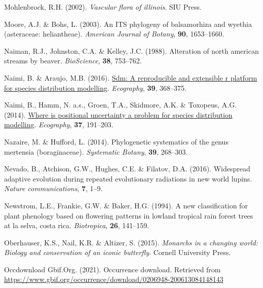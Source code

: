\documentclass[
]{article}
\newlength{\cslhangindent}
\newlength{\cslentryspacingunit} %
\newenvironment{CSLReferences}[2] %
 {%
  \setlength{\parindent}{0pt}
  \ifodd #1
  \let\oldpar\par
  \def\par{\hangindent=\cslhangindent\oldpar}
  \fi
  \setlength{\parskip}{#2\cslentryspacingunit}
 }%
 {}
\begin{document}
\begin{CSLReferences}{1}{0}
\leavevmode{}%
Mohlenbrock, R.H. (2002). \emph{Vascular flora of illinois}. SIU Press.

\leavevmode{}%
Moore, A.J. \& Bohs, L. (2003). An ITS phylogeny of balsamorhiza and
wyethia (asteraceae: heliantheae). \emph{American Journal of Botany},
\textbf{90}, 1653--1660.

\leavevmode{}%
Naiman, R.J., Johnston, C.A. \& Kelley, J.C. (1988). Alteration of north
american streams by beaver. \emph{BioScience}, \textbf{38}, 753--762.

\leavevmode{}%
Naimi, B. \& Araujo, M.B. (2016).
\href{https://doi.org/10.1111/ecog.01881}{Sdm: A reproducible and
extensible r platform for species distribution modelling}.
\emph{Ecography}, \textbf{39}, 368--375.

\leavevmode{}%
Naimi, B., Hamm, N. a.s., Groen, T.A., Skidmore, A.K. \& Toxopeus, A.G.
(2014). \href{https://doi.org/10.1111/j.1600-0587.2013.00205.x}{Where is
positional uncertainty a problem for species distribution modelling}.
\emph{Ecography}, \textbf{37}, 191--203.

\leavevmode{}%
Nazaire, M. \& Hufford, L. (2014). Phylogenetic systematics of the genus
mertensia (boraginaceae). \emph{Systematic Botany}, \textbf{39},
268--303.

\leavevmode{}%
Nevado, B., Atchison, G.W., Hughes, C.E. \& Filatov, D.A. (2016).
Widespread adaptive evolution during repeated evolutionary radiations in
new world lupins. \emph{Nature communications}, \textbf{7}, 1--9.

\leavevmode{}%
Newstrom, L.E., Frankie, G.W. \& Baker, H.G. (1994). A new
classification for plant phenology based on flowering patterns in
lowland tropical rain forest trees at la selva, costa rica.
\emph{Biotropica}, \textbf{26}, 141--159.

\leavevmode{}%
Oberhauser, K.S., Nail, K.R. \& Altizer, S. (2015). \emph{Monarchs in a
changing world: Biology and conservation of an iconic butterfly}.
Cornell University Press.

\leavevmode{}%
Occdownload Gbif.Org. (2021). Occurrence download. Retrieved from
\url{https://www.gbif.org/occurrence/download/0206948-200613084148143}


\end{CSLReferences}
\end{document}
